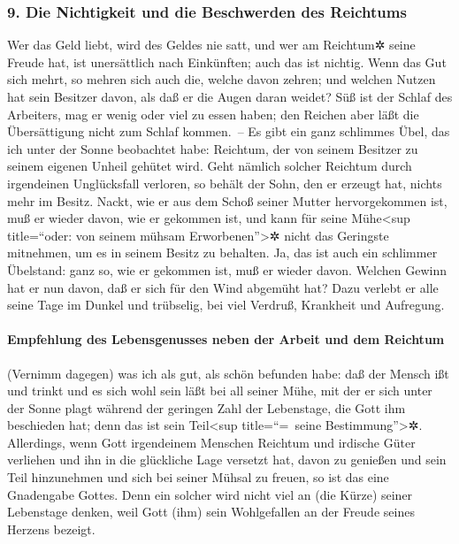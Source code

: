 \hypertarget{die-nichtigkeit-und-die-beschwerden-des-reichtums}{%
\subsubsection{9. Die Nichtigkeit und die Beschwerden des
Reichtums}\label{die-nichtigkeit-und-die-beschwerden-des-reichtums}}

Wer das Geld liebt, wird des Geldes nie satt, und wer am
Reichtum✲ seine Freude hat, ist unersättlich nach Einkünften; auch das
ist nichtig. Wenn das Gut sich mehrt, so mehren sich auch
die, welche davon zehren; und welchen Nutzen hat sein Besitzer davon,
als daß er die Augen daran weidet? Süß ist der Schlaf des
Arbeiters, mag er wenig oder viel zu essen haben; den Reichen aber läßt
die Übersättigung nicht zum Schlaf kommen.~-- Es gibt ein
ganz schlimmes Übel, das ich unter der Sonne beobachtet habe: Reichtum,
der von seinem Besitzer zu seinem eigenen Unheil gehütet wird.
Geht nämlich solcher Reichtum durch irgendeinen
Unglücksfall verloren, so behält der Sohn, den er erzeugt hat, nichts
mehr im Besitz. Nackt, wie er aus dem Schoß seiner Mutter
hervorgekommen ist, muß er wieder davon, wie er gekommen ist, und kann
für seine Mühe\textless sup title=``oder: von seinem mühsam
Erworbenen''\textgreater✲ nicht das Geringste mitnehmen, um es in seinem
Besitz zu behalten. Ja, das ist auch ein schlimmer
Übelstand: ganz so, wie er gekommen ist, muß er wieder davon. Welchen
Gewinn hat er nun davon, daß er sich für den Wind abgemüht hat?
Dazu verlebt er alle seine Tage im Dunkel und trübselig,
bei viel Verdruß, Krankheit und Aufregung.

\hypertarget{empfehlung-des-lebensgenusses-neben-der-arbeit-und-dem-reichtum}{%
\paragraph{Empfehlung des Lebensgenusses neben der Arbeit und dem
Reichtum}\label{empfehlung-des-lebensgenusses-neben-der-arbeit-und-dem-reichtum}}

(Vernimm dagegen) was ich als gut, als schön befunden
habe: daß der Mensch ißt und trinkt und es sich wohl sein läßt bei all
seiner Mühe, mit der er sich unter der Sonne plagt während der geringen
Zahl der Lebenstage, die Gott ihm beschieden hat; denn das ist sein
Teil\textless sup title=``=~seine Bestimmung''\textgreater✲.
Allerdings, wenn Gott irgendeinem Menschen Reichtum und
irdische Güter verliehen und ihn in die glückliche Lage versetzt hat,
davon zu genießen und sein Teil hinzunehmen und sich bei seiner Mühsal
zu freuen, so ist das eine Gnadengabe Gottes. Denn ein
solcher wird nicht viel an (die Kürze) seiner Lebenstage denken, weil
Gott (ihm) sein Wohlgefallen an der Freude seines Herzens bezeigt.

